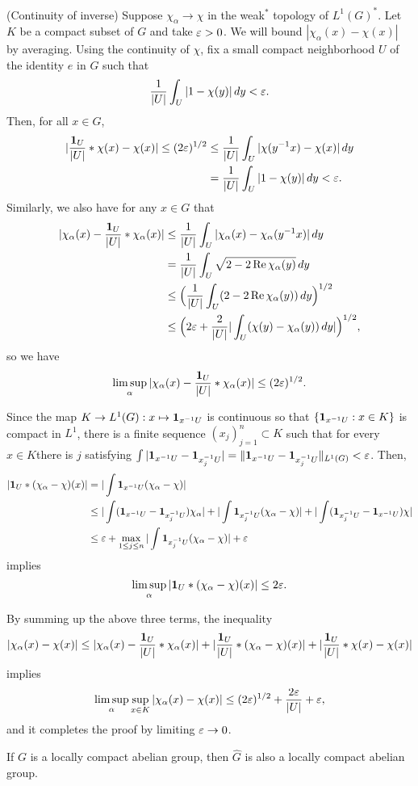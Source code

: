 \documentclass[a4paper]{article}
\begin{document}
\begin{pf}
(Continuity of inverse)
Suppose $\chi_\alpha\to\chi$ in the weak$^*$ topology of $L^1(G)^*$.
Let $K$ be a compact subset of $G$ and take $\varepsilon>0$.
We will bound $|\chi_\alpha(x)-\chi(x)|$ by averaging.
Using the continuity of $\chi$, fix a small compact neighborhood $U$ of the identity $e$ in $G$ such that
\[\frac1{|U|}\int_U|1-\chi(y)|\,dy<\varepsilon.\]
Then, for all $x\in G$,
\begin{align*}
|\frac{\mathbf{1}_U}{|U|}*\chi(x)-\chi(x)|\le(2\varepsilon)^{1/2}
&\le\frac1{|U|}\int_U|\chi(y^{-1}x)-\chi(x)|\,dy\\
&=\frac1{|U|}\int_U|1-\chi(y)|\,dy<\varepsilon.
\end{align*}
Similarly, we also have for any $x\in G$ that
\begin{align*}
|\chi_\alpha(x)-\frac{\mathbf{1}_U}{|U|}*\chi_\alpha(x)|
&\le\frac1{|U|}\int_U|\chi_\alpha(x)-\chi_\alpha(y^{-1}x)|\,dy\\
&=\frac1{|U|}\int_U\sqrt{2-2\operatorname{Re} \chi_\alpha(y)}\,dy\\
&\le\Bigl(\frac1{|U|}\int_U(2-2\operatorname{Re}\chi_\alpha(y))\,dy\Bigr)^{1/2}\\
&\le\Bigl(2\varepsilon+\frac2{|U|}|\int_U(\chi(y)-\chi_\alpha(y))\,dy|\Bigr)^{1/2},
\end{align*}
so we have
\[\limsup_\alpha|\chi_\alpha(x)-\frac{\mathbf{1}_U}{|U|}*\chi_\alpha(x)|\le(2\varepsilon)^{1/2}.\]

Since the map $K\to L^1(G):x\mapsto\mathbf{1}_{x^{-1}U}$ is continuous so that $\{\mathbf{1}_{x^{-1}U}:x\in K\}$ is compact in $L^1$, there is a finite sequence $(x_j)_{j=1}^n\subset K$ such that for every $x\in K$there is $j$ satisfying $\int|\mathbf{1}_{x^{-1}U}-\mathbf{1}_{x_j^{-1}U}|=\|\mathbf{1}_{x^{-1}U}-\mathbf{1}_{x_j^{-1}U}\|_{L^1(G)}<\varepsilon$.
Then,
\begin{align*}
|\mathbf{1}_U*(\chi_\alpha-\chi)(x)|
&=|\int\mathbf{1}_{x^{-1}U}(\chi_\alpha-\chi)|\\
&\le|\int(\mathbf{1}_{x^{-1}U}-\mathbf{1}_{x_j^{-1}U})\chi_\alpha|+|\int\mathbf{1}_{x_j^{-1}U}(\chi_\alpha-\chi)|+|\int(\mathbf{1}_{x_j^{-1}U}-\mathbf{1}_{x^{-1}U})\chi|\\
&\le\varepsilon+\max_{1\le j\le n}|\int\mathbf{1}_{x_j^{-1}U}(\chi_\alpha-\chi)|+\varepsilon
\end{align*}
implies
\[\limsup_\alpha|\mathbf{1}_U*(\chi_\alpha-\chi)(x)|\le2\varepsilon.\]

By summing up the above three terms, the inequality
\begin{align*}
|\chi_\alpha(x)-\chi(x)|\le|\chi_\alpha(x)-\frac{\mathbf{1}_U}{|U|}*\chi_\alpha(x)|+|\frac{\mathbf{1}_U}{|U|}*(\chi_\alpha-\chi)(x)|+|\frac{\mathbf{1}_U}{|U|}*\chi(x)-\chi(x)|
\end{align*}
implies
\[\limsup_\alpha\sup_{x\in K}|\chi_\alpha(x)-\chi(x)|\le(2\varepsilon)^{1/2}+\frac{2\varepsilon}{|U|}+\varepsilon,\]
and it completes the proof by limiting $\varepsilon\to0$.
\end{pf}
\begin{cor}
If $G$ is a locally compact abelian group, then $\hat G$ is also a locally compact abelian group.
\end{cor}
\end{document}
